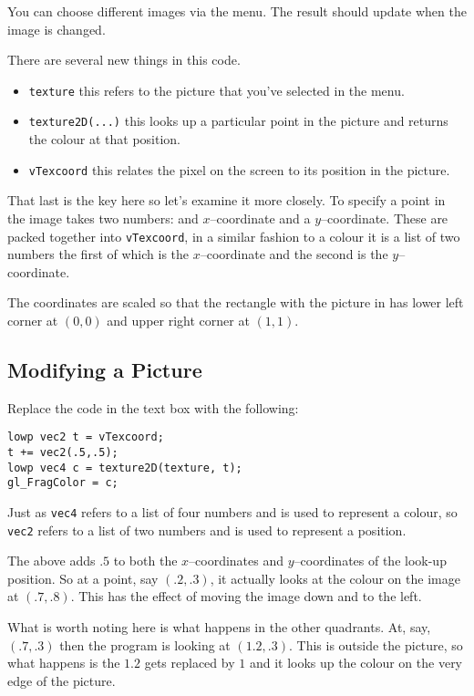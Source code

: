 \documentclass[
  html5,%
  mathml,%
  use filename%
]{internet}
\begin{document}
You can choose different images via the menu.
The result should update when the image is changed.

There are several new things in this code.

\begin{itemize}
\item \verb+texture+ this refers to the picture that you've selected in the menu.
\item \verb+texture2D(...)+ this looks up a particular point in the picture and returns the colour at that position.
\item \verb+vTexcoord+ this relates the pixel on the screen to its position in the picture.
\end{itemize}

That last is the key here so let's examine it more closely.
To specify a point in the image takes two numbers: and \(x\)--coordinate and a \(y\)--coordinate.
These are packed together into \verb+vTexcoord+, in a similar fashion to a colour it is a list of two numbers the first of which is the \(x\)--coordinate and the second is the \(y\)--coordinate.

The coordinates are scaled so that the rectangle with the picture in has lower left corner at \((0,0)\) and upper right corner at \((1,1)\).

\subsection{Modifying a Picture}
\label{sec:modify}

Replace the code in the text box with the following:

\begin{tcolorbox}
\begin{verbatim}
lowp vec2 t = vTexcoord;
t += vec2(.5,.5);
lowp vec4 c = texture2D(texture, t);
gl_FragColor = c;
\end{verbatim}
\end{tcolorbox}

Just as \verb+vec4+ refers to a list of four numbers and is used to represent a colour, so \verb+vec2+ refers to a list of two numbers and is used to represent a position.

The above adds \(.5\) to both the \(x\)--coordinates and \(y\)--coordinates of the look-up position.
So at a point, say \((.2,.3)\), it actually looks at the colour on the image at \((.7,.8)\).
This has the effect of moving the image down and to the left.

What is worth noting here is what happens in the other quadrants.
At, say, \((.7,.3)\) then the program is looking at \((1.2,.3)\).
This is outside the picture, so what happens is the \(1.2\) gets replaced by \(1\) and it looks up the colour on the very edge of the picture.
\end{document}
